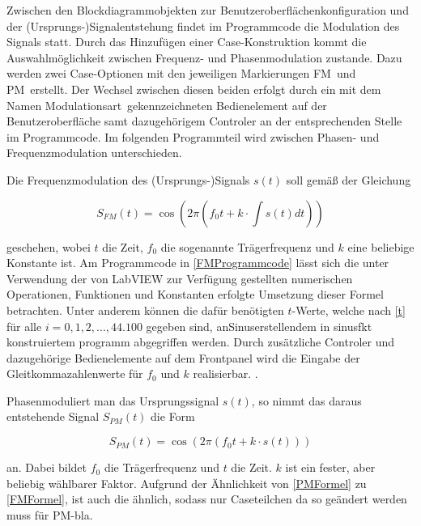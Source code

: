 \documentclass[
a4paper,
12pt,
pagesize,
ngerman
]{scrartcl}
\begin{document}
	Zwischen den Blockdiagrammobjekten zur Benutzeroberflächenkonfiguration und der (Ursprungs-)Signalentstehung findet im Programmcode die Modulation des Signals statt. Durch das Hinzufügen einer Case-Konstruktion kommt die Auswahlmöglichkeit zwischen Frequenz- und Phasenmodulation zustande. Dazu werden zwei Case-Optionen mit den jeweiligen Markierungen \glqq FM\grqq\ und \glqq PM\grqq\ erstellt. Der Wechsel zwischen diesen beiden erfolgt durch ein mit dem Namen \glqq Modulationsart\grqq\ gekennzeichneten Bedienelement auf der Benutzeroberfläche samt dazugehörigem Controler an der entsprechenden Stelle im Programmcode.                                 Im folgenden Programmteil wird zwischen Phasen- und Frequenzmodulation unterschieden.
	
	
	
	
	
	Die Frequenzmodulation des (Ursprungs-)Signals $s(t)$ soll gemäß der Gleichung
	
	\begin{equation} \label{FMFormel}
	S_{FM}(t) = \cos (2\pi (f_0 t + k \cdot \int s(t) dt))
	\end{equation}
	
	\noindent geschehen, wobei $t$ die Zeit, $f_0$ die sogenannte Trägerfrequenz und $k$ eine beliebige Konstante ist. Am Programmcode in \cref{FMProgrammcode} lässt sich die unter Verwendung der von LabVIEW zur Verfügung gestellten numerischen Operationen, Funktionen und Konstanten erfolgte Umsetzung dieser Formel betrachten. Unter anderem können die dafür benötigten $t$-Werte, welche nach \cref{t} für alle $i = 0,1,2,...,44.100$ gegeben sind, anSinuserstellendem in sinusfkt konstruiertem programm abgegriffen werden. Durch zusätzliche Controler und dazugehörige Bedienelemente auf dem Frontpanel wird die Eingabe der Gleitkommazahlenwerte für $f_0$ und $k$ realisierbar. . %
	
	
	
	
	
	
	Phasenmoduliert man das Ursprungssignal $s(t)$, so nimmt das daraus entstehende Signal $S_{PM}(t)$ die Form
	
	\begin{equation} \label{PMFormel}
	S_{PM}(t) = \cos (2\pi (f_0 t + k \cdot s(t)))
	\end{equation}
	
	\noindent an. Dabei bildet $f_0$ die Trägerfrequenz und $t$ die Zeit. $k$ ist ein fester, aber beliebig wählbarer Faktor. Aufgrund der Ähnlichkeit von \cref{PMFormel} zu \cref{FMFormel}, ist auch die  ähnlich, sodass nur Caseteilchen da so geändert werden muss für PM-bla. 
	
\end{document}
